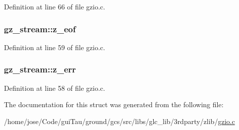 Definition at line 66 of file gzio.\-c.

\hypertarget{structgz__stream_a1d0148ec4694b3ba81889cacb85b136a}{
\subsubsection[{z\-\_\-eof}]{ gz\-\_\-stream\-::z\-\_\-eof}}\label{structgz__stream_a1d0148ec4694b3ba81889cacb85b136a}


Definition at line 59 of file gzio.\-c.

\hypertarget{structgz__stream_ace34952b7eac004c84d1d3726c5a3187}{
\subsubsection[{z\-\_\-err}]{ gz\-\_\-stream\-::z\-\_\-err}}\label{structgz__stream_ace34952b7eac004c84d1d3726c5a3187}


Definition at line 58 of file gzio.\-c.



The documentation for this struct was generated from the following file\-:\begin{DoxyCompactItemize}
\item 
/home/jose/\-Code/gui\-Tau/ground/gcs/src/libs/glc\-\_\-lib/3rdparty/zlib/\hyperlink{gzio_8c}{gzio.\-c}\end{DoxyCompactItemize}

